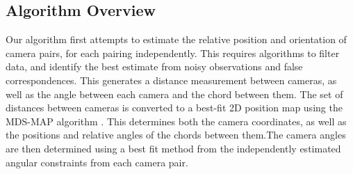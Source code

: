 \documentclass[journal]{IEEEtran}
\begin{document}
	\subsection{Algorithm Overview}
		\indent Our algorithm first attempts to estimate the relative position and orientation of camera pairs, for each pairing independently. This requires algorithms to filter data, and identify the best estimate from noisy observations and false correspondences. This generates a distance measurement between cameras, as well as the angle between each camera and the chord between them. The set of distances between cameras is converted to a best-fit 2D position map using the MDS-MAP algorithm \cite{shang2003}. This determines both the camera coordinates, as well as the positions and relative angles of the chords between them.The camera angles are then determined using a best fit method from the independently estimated angular constraints from each camera pair.
\end{document}
